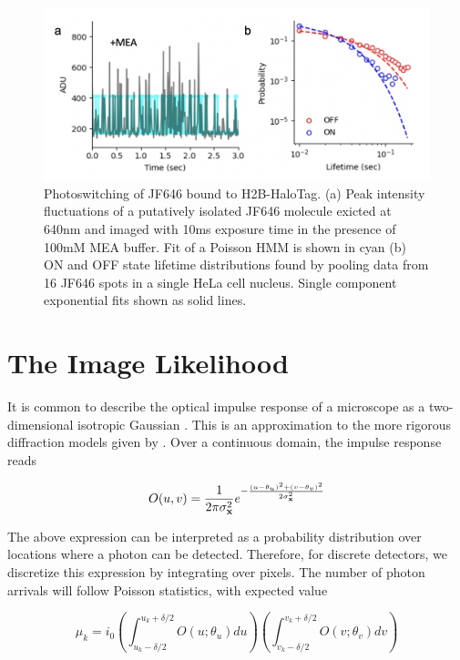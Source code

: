 \begin{figure}[t]
\centering
\includegraphics[width=13cm]{media/Lifetime.png}
\caption{Photoswitching of JF646 bound to H2B-HaloTag. (a) Peak intensity fluctuations of a putatively isolated JF646 molecule exicted at 640nm and imaged with 10ms exposure time in the presence of 100mM MEA buffer. Fit of a Poisson HMM is shown in cyan (b) ON and OFF state lifetime distributions found by pooling data from 16 JF646 spots in a single HeLa cell nucleus. Single component exponential fits shown as solid lines.}
\end{figure}


\section{The Image Likelihood}

It is common to describe the optical impulse response of a microscope as a two-dimensional isotropic Gaussian \parencite{Zhang2007}. This is an approximation to the more rigorous diffraction models given by \parencite{Richards1959,Gibson1989}. Over a continuous domain, the impulse response reads

\begin{equation*}
O(u,v) = \frac{1}{2\pi\sigma_{\bold{x}}^{2}}e^{-\frac{(u-\theta_{u})^{2}+(v-\theta_{v})^{2}}{2\sigma_{\bold{x}}^{2}}}
\end{equation*}

The above expression can be interpreted as a probability distribution over locations where a photon can be detected. Therefore, for discrete detectors, we discretize this expression by integrating over pixels. The number of photon arrivals will follow Poisson statistics, with expected value

\begin{equation*}
\mu_{k} = i_{0}\left(\int_{u_{k}-\delta /2}^{u_{k}+\delta /2} O(u; \theta_{u})du \right)\left(\int_{v_{k}-\delta /2}^{v_{k}+\delta /2} O(v;\theta_{v})dv \right)
\end{equation*}

